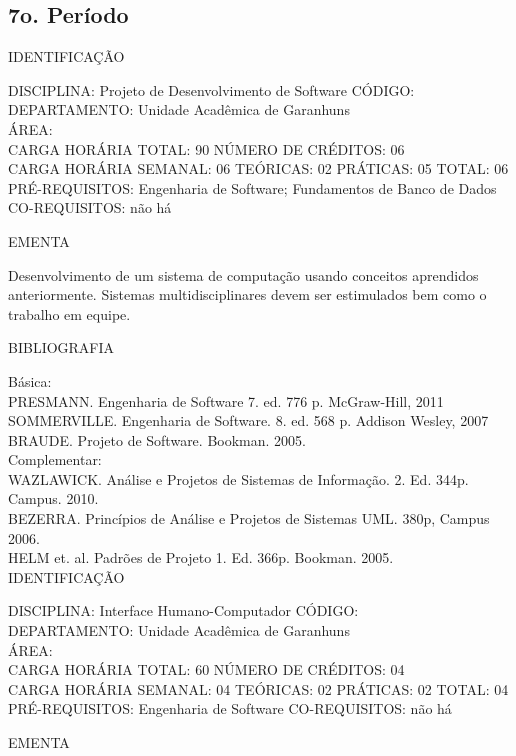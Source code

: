 \documentclass[
	12pt,				%
	openright,			%
  oneside,     %
	a4paper,			%
	english,			%
	french,				%
	spanish,			%
	brazil				%
	]{abntex2}
\begin{document}
\begin{apendicesenv}
\section*{7o. Período}

IDENTIFICAÇÃO

DISCIPLINA: Projeto de Desenvolvimento de Software CÓDIGO:\\ 
DEPARTAMENTO: Unidade Acadêmica de Garanhuns\\ 
ÁREA: \\
CARGA HORÁRIA TOTAL: 90 NÚMERO DE CRÉDITOS: 06\\
CARGA HORÁRIA SEMANAL: 06 TEÓRICAS: 02 PRÁTICAS: 05 TOTAL: 06\\
PRÉ-REQUISITOS: Engenharia de Software; Fundamentos de Banco de Dados\\
CO-REQUISITOS: não há

EMENTA 

Desenvolvimento de um sistema de computação usando conceitos aprendidos
anteriormente. Sistemas multidisciplinares devem ser estimulados bem
como o trabalho em equipe.

BIBLIOGRAFIA 

Básica:\\
PRESMANN. Engenharia de Software 7. ed. 776 p. McGraw-Hill, 2011\\
SOMMERVILLE. Engenharia de Software. 8. ed. 568 p. Addison Wesley, 2007\\
BRAUDE. Projeto de Software. Bookman. 2005.\\
Complementar:\\
WAZLAWICK. Análise e Projetos de Sistemas de Informação. 2. Ed. 344p.
Campus. 2010.\\
BEZERRA. Princípios de Análise e Projetos de Sistemas UML. 380p, Campus
2006.\\
HELM et. al. Padrões de Projeto 1. Ed. 366p. Bookman. 2005.\\


\newpage IDENTIFICAÇÃO

DISCIPLINA: Interface Humano-Computador CÓDIGO:\\
DEPARTAMENTO: Unidade Acadêmica de Garanhuns\\
ÁREA: \\
CARGA HORÁRIA TOTAL: 60 NÚMERO DE CRÉDITOS: 04\\
CARGA HORÁRIA SEMANAL: 04 TEÓRICAS: 02 PRÁTICAS: 02 TOTAL: 04\\
PRÉ-REQUISITOS: Engenharia de Software
CO-REQUISITOS: não há

EMENTA 


\end{apendicesenv}
\end{document}
